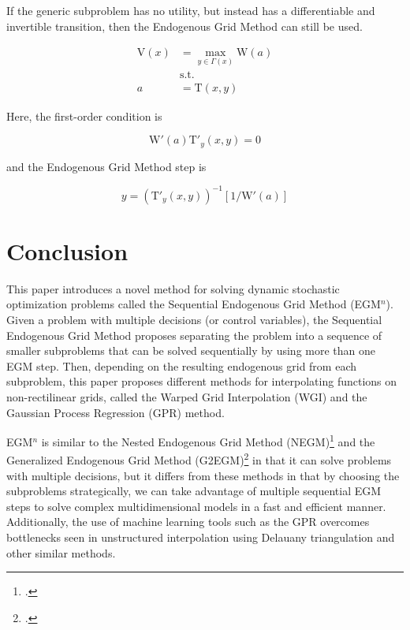 \documentclass{article}
\newcommand{\VFunc}{\mathrm{V}}
\newcommand{\PGro}{\Gamma}
\newcommand{\aRat}{a}
\newcommand{\xRat}{x}
\newcommand{\TFunc}{\mathrm{T}}
\newcommand{\WFunc}{\mathrm{W}}
\newcommand{\yRat}{y}
\begin{document}
If the generic subproblem has no utility, but instead has a differentiable and invertible transition, then the Endogenous Grid Method can still be used.

\begin{equation}
\begin{split}
        \VFunc(\xRat) &  = \max_{\yRat  \in \PGro(\xRat)}  \WFunc(\aRat) \\
        & \text{s.t.} \\
        \aRat & = \TFunc(\xRat,\yRat)
    \end{split}
\end{equation}

Here, the first-order condition is

\begin{equation}
\WFunc'(\aRat)\TFunc'_{\yRat}(\xRat,\yRat)  = 0
\end{equation}

and the Endogenous Grid Method step is

\begin{equation}
\yRat = \left(\TFunc'_{\yRat}(\xRat,\yRat)\right)^{-1} \left[ 1 / \WFunc'(\aRat)\right]
\end{equation}

\section{Conclusion}\label{conclusion}


This paper introduces a novel method for solving dynamic stochastic optimization problems called the Sequential Endogenous Grid Method (EGM$^n$). Given a problem with multiple decisions (or control variables), the Sequential Endogenous Grid Method proposes separating the problem into a sequence of smaller subproblems that can be solved sequentially by using more than one EGM step. Then, depending on the resulting endogenous grid from each subproblem, this paper proposes different methods for interpolating functions on non-rectilinear grids, called the Warped Grid Interpolation (WGI) and the Gaussian Process Regression (GPR) method.

EGM$^n$ is similar to the Nested Endogenous Grid Method (NEGM)\footnote{\citet{Druedahl2021}.} and the Generalized Endogenous Grid Method (G2EGM)\footnote{\citet{Druedahl2017}.} in that it can solve problems with multiple decisions, but it differs from these methods in that by choosing the subproblems strategically, we can take advantage of multiple sequential EGM steps to solve complex multidimensional models in a fast and efficient manner. Additionally, the use of machine learning tools such as the GPR overcomes bottlenecks seen in unstructured interpolation using Delauany triangulation and other similar methods.
\end{document}
